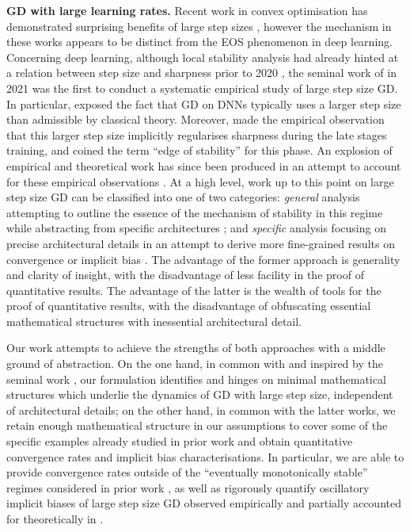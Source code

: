 \documentclass{article}
\newcommand{\myparagraph}[1]{\noindent\textbf{#1.}}
\theoremstyle{plain}
\theoremstyle{definition}
\theoremstyle{remark}
\begin{document}
\myparagraph{GD with large learning rates} Recent work in convex optimisation has demonstrated surprising benefits of large step sizes \cite{grimmer1, grimmer2, grimmer3, altschuler1, altschuler2}, however the mechanism in these works appears to be distinct from the EOS phenomenon in deep learning. Concerning deep learning, although local stability analysis had already hinted at a relation between step size and sharpness prior to 2020 \cite{wudynamicalstability}, the seminal work of \cite{coheneos} in 2021 was the first to conduct a systematic empirical study of large step size GD. In particular, \cite{coheneos} exposed the fact that GD on DNNs typically uses a larger step size than admissible by classical theory. Moreover, \cite{coheneos} made the empirical observation that this larger step size implicitly regularises sharpness during the late stages training, and coined the term ``edge of stability'' for this phase. An explosion of empirical and theoretical work has since been produced in an attempt to account for these empirical observations \cite{ahneos, aroraeos, wangeos, wang2022eos, wang2023eos,damianeos, leeeos, zhueos, agarwalaeos, chen2023eos, kreislereos, wu2023eos, wu2024eos, cai2024eos, kalraeos, liueos, ghosh2025eos}. At a high level, work up to this point on large step size GD can be classified into one of two categories: \emph{general} analysis attempting to outline the essence of the mechanism of stability in this regime while abstracting from specific architectures \cite{damianeos, cohen2025understanding}; and \emph{specific} analysis focusing on precise architectural details in an attempt to derive more fine-grained results on convergence \cite{wu2023eos, wu2024eos, cai2024eos, liueos} or implicit bias \cite{wang2022eos,wang2023eos,chen2023eos, kalraeos}. The advantage of the former approach is generality and clarity of insight, with the disadvantage of less facility in the proof of quantitative results. The advantage of the latter is the wealth of tools for the proof of quantitative results, with the disadvantage of obfuscating essential mathematical structures with inessential architectural detail.

Our work attempts to achieve the strengths of both approaches with a middle ground of abstraction. On the one hand, in common with and inspired by the seminal work \cite{damianeos}, our formulation identifies and hinges on minimal mathematical structures which underlie the dynamics of GD with large step size, independent of architectural details; on the other hand, in common with the latter works, we retain enough mathematical structure in our assumptions to cover some of the specific examples already studied in prior work and obtain quantitative convergence rates and implicit bias characterisations. In particular, we are able to provide convergence rates outside of the ``eventually monotonically stable'' regimes considered in prior work \cite{wu2023eos, wu2024eos, cai2024eos, liueos}, as well as rigorously quantify oscillatory implicit biases of large step size GD observed empirically and partially accounted for theoretically in \cite{chen2023eos, kalraeos}.
\end{document}
